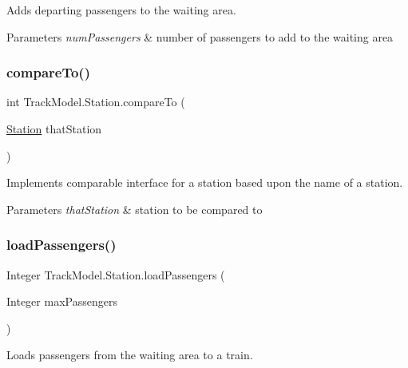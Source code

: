 Adds departing passengers to the waiting area. 


\begin{DoxyParams}{Parameters}
{\em num\+Passengers} & number of passengers to add to the waiting area \\
\hline
\end{DoxyParams}
\mbox{\label{classTrackModel_1_1Station_adca3eabc08f04c22e9f0f26c93ca9523}} 
\subsubsection{\texorpdfstring{compare\+To()}{compareTo()}}
{\footnotesize\ttfamily int Track\+Model.\+Station.\+compare\+To (\begin{DoxyParamCaption}\item[{\hyperlink{classTrackModel_1_1Station}{Station}}]{that\+Station }\end{DoxyParamCaption})}



Implements comparable interface for a station based upon the name of a station. 


\begin{DoxyParams}{Parameters}
{\em that\+Station} & station to be compared to \\
\hline
\end{DoxyParams}
\mbox{\label{classTrackModel_1_1Station_abba652aa7df49e552eebdc1fa4b1fae7}} 
\subsubsection{\texorpdfstring{load\+Passengers()}{loadPassengers()}}
{\footnotesize\ttfamily Integer Track\+Model.\+Station.\+load\+Passengers (\begin{DoxyParamCaption}\item[{Integer}]{max\+Passengers }\end{DoxyParamCaption})}



Loads passengers from the waiting area to a train. 



